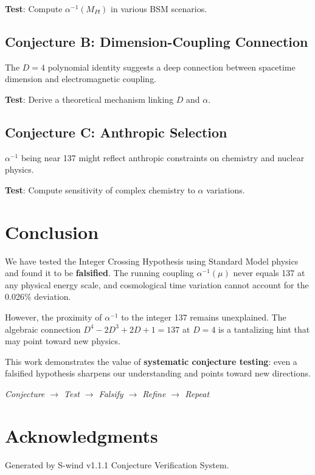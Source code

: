 \documentclass[11pt,a4paper]{article}
\begin{document}
\textbf{Test}: Compute $\alpha^{-1}(M_{Pl})$ in various BSM scenarios.

\subsection{Conjecture B: Dimension-Coupling Connection}

The $D=4$ polynomial identity suggests a deep connection between spacetime dimension and electromagnetic coupling.

\textbf{Test}: Derive a theoretical mechanism linking $D$ and $\alpha$.

\subsection{Conjecture C: Anthropic Selection}

$\alpha^{-1}$ being near 137 might reflect anthropic constraints on chemistry and nuclear physics.

\textbf{Test}: Compute sensitivity of complex chemistry to $\alpha$ variations.

\section{Conclusion}

We have tested the Integer Crossing Hypothesis using Standard Model physics and found it to be \textbf{falsified}. The running coupling $\alpha^{-1}(\mu)$ never equals 137 at any physical energy scale, and cosmological time variation cannot account for the 0.026\% deviation.

However, the proximity of $\alpha^{-1}$ to the integer 137 remains unexplained. The algebraic connection $D^4 - 2D^3 + 2D + 1 = 137$ at $D=4$ is a tantalizing hint that may point toward new physics.

This work demonstrates the value of \textbf{systematic conjecture testing}: even a falsified hypothesis sharpens our understanding and points toward new directions.

\begin{center}
\textit{Conjecture $\to$ Test $\to$ Falsify $\to$ Refine $\to$ Repeat}
\end{center}

\section*{Acknowledgments}

Generated by S-wind v1.1.1 Conjecture Verification System.
\end{document}
